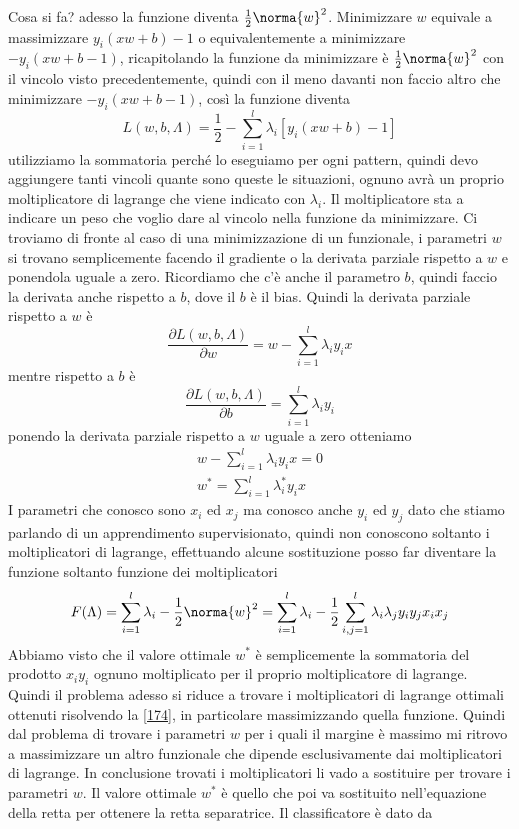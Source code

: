 \noindent Cosa si fa? adesso la funzione diventa $\frac{1}{2} \norma{w}^2$. Minimizzare $w$ equivale a massimizzare $y_i(xw + b) - 1$ o equivalentemente a minimizzare $-y_i(xw + b - 1)$, ricapitolando la funzione da minimizzare è $\frac{1}{2} \norma{w}^2$ con il vincolo visto precedentemente, quindi con il meno davanti non faccio altro che minimizzare $-y_i(xw + b - 1)$, così la funzione diventa 
\begin{equation}
L(w,b,\Lambda) = \frac{1}{2} - \sum_{i=1}^l \lambda_i \left[ y_i (xw + b) - 1\right]
\end{equation}
utilizziamo la sommatoria perché lo eseguiamo per ogni pattern, quindi devo aggiungere tanti vincoli quante sono queste le situazioni, ognuno avrà un proprio moltiplicatore di lagrange che viene indicato con $\lambda_i$. Il moltiplicatore sta a indicare un peso che voglio dare al vincolo nella funzione da minimizzare. Ci troviamo di fronte al caso di una minimizzazione di un funzionale, i parametri $w$ si trovano semplicemente facendo il gradiente o la derivata parziale rispetto a $w$ e ponendola uguale a zero. Ricordiamo che c'è anche il parametro $b$, quindi faccio la derivata anche rispetto a $b$, dove il $b$ è il bias. 
Quindi la derivata parziale rispetto a $w$ è
\begin{equation}
\frac{\partial L(w,b,\Lambda)}{\partial w} = w - \sum_{i=1}^l \lambda_i y_i x
\end{equation}
mentre rispetto a $b$ è
\begin{equation}
\frac{\partial L(w,b,\Lambda)}{\partial b} = \sum_{i=1}^l \lambda_i y_i
\end{equation}
ponendo la derivata parziale rispetto a $w$ uguale a zero otteniamo
\begin{gather}
w - \sum_{i=1}^l \lambda_i y_i x = 0\\
w^* = \sum_{i=1}^l \lambda_i^* y_i x 
\end{gather}
I parametri che conosco sono $x_i$ ed $x_j$ ma conosco anche $y_i$ ed $y_j$ dato che stiamo parlando di un apprendimento supervisionato, quindi non conoscono soltanto i moltiplicatori di lagrange, effettuando alcune sostituzione posso far diventare la funzione soltanto funzione dei moltiplicatori
\begin{equation}\label{174}
F(\Lambda) = \sum_{i=1}^l \lambda_i - \frac{1}{2} \norma{w}^2 = \sum_{i=1}^l \lambda_i - \frac{1}{2} \sum_{i,j=1}^l \lambda_i \lambda_j y_i y_j x_i x_j
\end{equation}
Abbiamo visto che il valore ottimale $w^*$ è semplicemente la sommatoria del prodotto $x_i y_i$ ognuno moltiplicato per il proprio moltiplicatore di lagrange. Quindi il problema adesso si riduce a trovare i moltiplicatori di lagrange ottimali ottenuti risolvendo la \ref{174}, in particolare massimizzando quella funzione. Quindi dal problema di trovare i parametri $w$ per i quali il margine è massimo mi ritrovo a massimizzare un altro funzionale che dipende esclusivamente dai moltiplicatori di lagrange. In conclusione trovati i moltiplicatori li vado a sostituire per trovare i parametri $w$. Il valore ottimale $w^*$ è quello che poi va sostituito nell'equazione della retta per ottenere la retta separatrice. Il classificatore è dato da 
